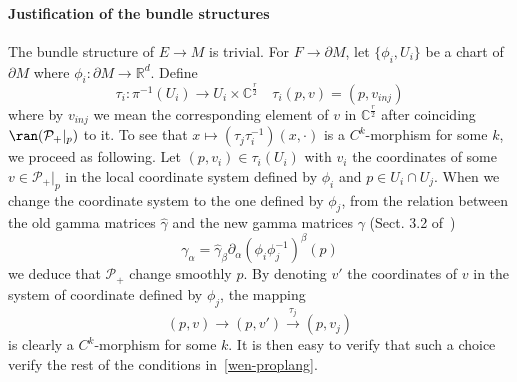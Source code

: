 \paragraph{Justification of the bundle structures}
The bundle structure of $E \rightarrow M$ is trivial. 
For $F \rightarrow \partial M$,
let $\{\phi_i, U_i\}$ be a chart of $\partial M$ where $\phi_i : \partial M \rightarrow \mathbb{R}^{d}$. 
Define 
\begin{equation*}
\tau_i : \pi^{-1}(U_i) \rightarrow U_i \times \mathbb C^\frac{r}{2} \quad \tau_i(p, v) = (p, v_{inj})
\end{equation*}
where by $v_{inj}$ we mean the corresponding element of $v$ in $\mathbb{C}^{\frac r 2}$ after coinciding $\ran(\mathcal{P}_+\vert_p)$ to it.
To see that $x \mapsto (\tau_j\tau_i^{-1})(x, \cdot)$ is a $C^k$-morphism for some $k$, we proceed as following.
Let $(p, v_i) \in \tau_i (U_i)$ with $v_i$ the coordinates of some $v \in \mathcal{P}_+\vert_p$ in the local coordinate system defined by $\phi_i$ and  $p \in U_i \cap U_j$.
When we change the coordinate system to the one defined by $\phi_j$, 
from the relation between the old gamma matrices $\hat\gamma$ and the new gamma matrices $\gamma$ (Sect. 3.2 of~\cite{Snygg1997}) 
\begin{equation*}
\gamma_\alpha = \hat{\gamma}_\beta\partial_\alpha (\phi_i \phi_j^{-1})^\beta(p)
\end{equation*}
we deduce that $\mathcal{P}_+$ change smoothly \wrt $p$.
By denoting $v'$ the coordinates of $v$ in the system of coordinate defined by $\phi_j$, the mapping 
\begin{equation*}
(p, v) \overset{}{\longrightarrow}(p, v')
\overset{\tau_j}{\longrightarrow} (p, v_j)
\end{equation*}
is clearly a $C^k$-morphism for some $k$.
It is then easy to verify that such a choice verify the rest of the conditions in~\cref{wen-proplang}. \\\\
